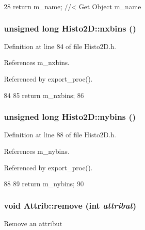\begin{DoxyCode}
28 { return m_name; } //< Get Object m_name
\end{DoxyCode}
\hypertarget{classHisto2D_aac422991db96030ce7ca3952e4d277f2}{
\subsubsection[{nxbins}]{\setlength{\rightskip}{0pt plus 5cm}unsigned long Histo2D::nxbins ()}}
\label{classHisto2D_aac422991db96030ce7ca3952e4d277f2}


Definition at line 84 of file Histo2D.h.

References m\_\-nxbins.

Referenced by export\_\-proc().


\begin{DoxyCode}
84                         {  
85     return m_nxbins;
86   }
\end{DoxyCode}
\hypertarget{classHisto2D_a17ee49d9e1c5d62edc887f4f63f68db6}{
\subsubsection[{nybins}]{\setlength{\rightskip}{0pt plus 5cm}unsigned long Histo2D::nybins ()}}
\label{classHisto2D_a17ee49d9e1c5d62edc887f4f63f68db6}


Definition at line 88 of file Histo2D.h.

References m\_\-nybins.

Referenced by export\_\-proc().


\begin{DoxyCode}
88                         {  
89     return m_nybins;
90   }
\end{DoxyCode}
\hypertarget{classAttrib_a7d4ef7e32d93cb287792b87b857e79f3}{
\subsubsection[{remove}]{\setlength{\rightskip}{0pt plus 5cm}void Attrib::remove (int {\em attribut})}}
\label{classAttrib_a7d4ef7e32d93cb287792b87b857e79f3}
Remove an attribut 

